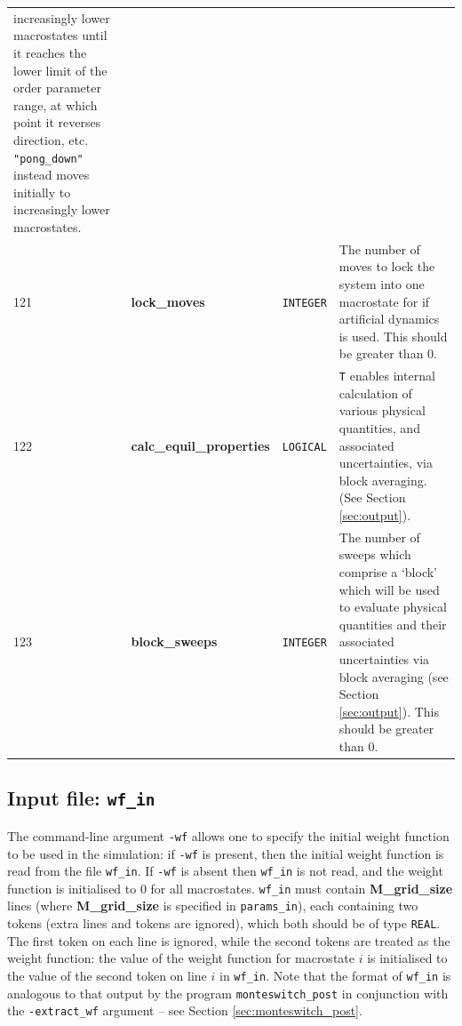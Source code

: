 \documentclass{report}
\begin{document}
\begin{landscape}
\begin{center}
\begin{longtable}{l l l p{8cm}}
increasingly lower macrostates until it reaches the lower limit of the order parameter range, at which point it reverses direction, etc. 
\texttt{"pong\_down"}
instead moves initially to increasingly lower macrostates.  \\
121 & \textbf{lock\_moves}  &  \texttt{INTEGER}  & The number of moves to lock the system into one macrostate for if artificial dynamics is used. 
This should be greater than 0. \\
122 & \textbf{calc\_equil\_properties}  &  \texttt{LOGICAL}  & \texttt{T} enables internal calculation of various physical quantities, and associated
uncertainties, via block averaging. (See Section \ref{sec:output}). \\
123 & \textbf{block\_sweeps}  &  \texttt{INTEGER}  & The number of sweeps which comprise a `block' which will be used to evaluate physical quantities and
their associated uncertainties via block averaging (see Section \ref{sec:output}). This should be greater than 0. \\
\end{longtable}
\end{center}
\end{landscape}


\subsection{Input file: \texttt{wf\_in}}
The command-line argument \texttt{-wf} allows one to specify the initial weight function to be used in the simulation: if \texttt{-wf} is present, then
the initial weight function is read from the file \texttt{wf\_in}. If \texttt{-wf} is absent then \texttt{wf\_in} is not read, and the weight function 
is initialised to 0 for all macrostates. \texttt{wf\_in} must contain \textbf{M\_grid\_size} lines
(where \textbf{M\_grid\_size} is specified in \texttt{params\_in}), each containing two tokens (extra lines and tokens are ignored),
which both should be of type \texttt{REAL}. The first token on each line is ignored, while the second tokens are treated as the
weight function: the value of the weight function for macrostate $i$ is initialised to the value of the second token on line $i$ in
\texttt{wf\_in}. Note that the format of \texttt{wf\_in} is analogous to that output by the program \texttt{monteswitch\_post} in conjunction with the
\texttt{-extract\_wf} argument -- see Section \ref{sec:monteswitch_post}.
\end{document}
